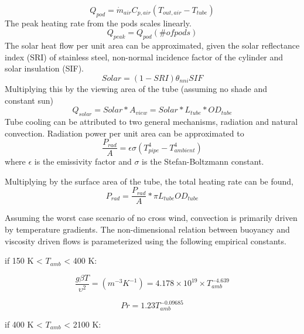 \documentclass[heading.tex]{subfiles}
\begin{document}
\begin{equation*}
{Q}_{pod}= \dot{m}_{air} C_{p,air} (T_{out, air} - T_{tube})
\end{equation*}
The peak heating rate from the pods scales linearly.
\begin{equation*}
{Q}_{peak}= Q_{pod} (\# ofpods)
\end{equation*}
The solar heat flow per unit area can be approximated, given the solar reflectance index (SRI) of stainless steel, non-normal incidence factor
of the cylinder and solar insulation (SIF).
\begin{equation*}
Solar = (1-SRI) {\theta}_{nni} SIF
\end{equation*}
Multiplying this by the viewing area of the tube (assuming no shade and constant sun)
\begin{equation*}
Q_{solar} = Solar * A_{view} = Solar * L_{tube} * OD_{tube}
\end{equation*}
Tube cooling can be attributed to two general mechanisms, radiation and natural convection. Radiation power per unit area can be
approximated to
\begin{equation*}
\frac{P_{rad}}{A} = \epsilon \sigma (T_{pipe}^4 - T_{ambient}^4)
\end{equation*}
where  $\epsilon$ is the emissivity factor and  $\sigma$ is the Stefan-Boltzmann constant.

Multiplying by the surface area of the tube, the total heating rate can be found,
\begin{equation*}
P_{rad} =  \frac{P_{rad}}{A} * \pi L_{tube} OD_{tube}
\end{equation*}

Assuming the worst case scenario of no cross wind, convection is primarily driven by temperature gradients. The non-dimensional relation
between buoyancy and viscosity driven flows is parameterized using the following empirical constants. \cite{Berton} \cite{Incropera}

if 150 K <  $T_{amb}$ < 400 K:

\begin{equation*}
\frac{g \beta T} {\upsilon^2} = (m^{-3}K^{-1}) = 4.178\times10^{19} \times T_{amb}^{-4.639}
\end{equation*}

\begin{equation*}
Pr = 1.23 T_{amb}^{-0.09685}
\end{equation*}

if 400 K <  $T_{amb}$ < 2100 K:
\end{document}
